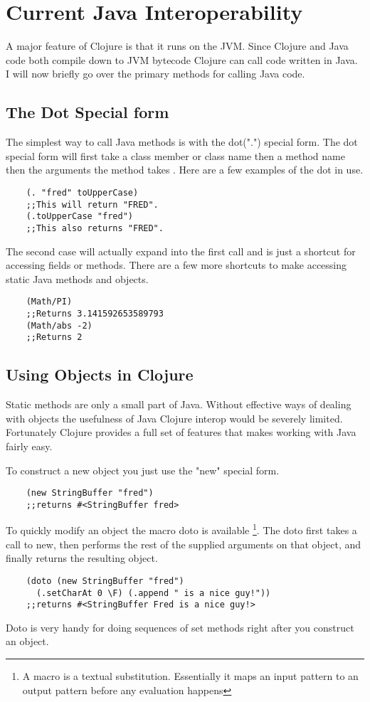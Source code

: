 \documentclass[12pt]{article}
\begin{document}
\section{Current Java Interoperability}\label{sec:bg}
	A major feature of Clojure is that it runs on the JVM. Since Clojure and Java code both compile down to JVM bytecode Clojure can call code written in Java. I will now briefly go over the primary methods for calling Java code.
	
	\subsection{The Dot Special form}
	The simplest way to call Java methods is with the dot(".") special form. The dot special form will first take a class member or class name then a method name then the arguments the method takes \cite{cloj:interop}. Here are a few examples of the dot in use.
	\begin{verbatim}
	(. "fred" toUpperCase)
	;;This will return "FRED".
	(.toUpperCase "fred")
	;;This also returns "FRED".
	\end{verbatim}
	The second case will actually expand into the first call and is just a shortcut for accessing fields or methods. There are a few more shortcuts to make accessing static Java methods and objects.
	
	\begin{verbatim}
	(Math/PI)
	;;Returns 3.141592653589793
	(Math/abs -2)
	;;Returns 2
	\end{verbatim}
	
	\subsection{Using Objects in Clojure}
	Static methods are only a small part of Java. Without effective ways of dealing with objects the usefulness of Java Clojure interop would be severely limited. Fortunately Clojure provides a full set of features that makes working with Java fairly easy.
	
	To construct a new object you just use the "new" special form.
	\begin{verbatim}
	(new StringBuffer "fred")
	;;returns #<StringBuffer fred>
	\end{verbatim} 
	
	To quickly modify an object the macro doto is available \footnote[1]{A macro is a textual substitution. Essentially it maps an input pattern to an output pattern before any evaluation happens}. The doto first takes a call to new, then performs the rest of the supplied arguments on that object, and finally returns the resulting object.
	\begin{verbatim}
	(doto (new StringBuffer "fred") 
	  (.setCharAt 0 \F) (.append " is a nice guy!"))
	;;returns #<StringBuffer Fred is a nice guy!>
	\end{verbatim}
	Doto is very handy for doing sequences of set methods right after you construct an object.
	
\end{document}
